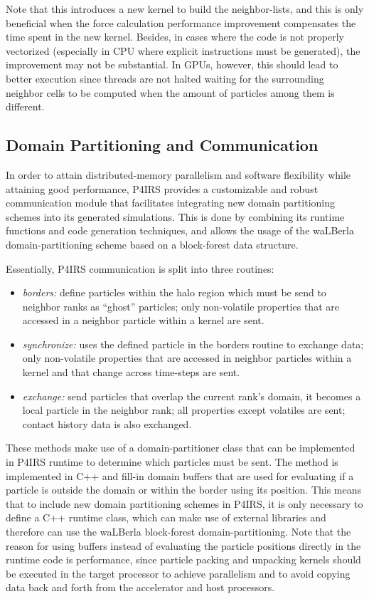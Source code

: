 \documentclass[Afour,sageh,times]{sagej}
\begin{document}
Note that this introduces a new kernel to build the neighbor-lists, and this is only beneficial when the force calculation performance improvement compensates the time spent in the new kernel.
Besides, in cases where the code is not properly vectorized (especially in CPU where explicit instructions must be generated), the improvement may not be substantial.
In GPUs, however, this should lead to better execution since threads are not halted waiting for the surrounding neighbor cells to be computed when the amount of particles among them is different.

\subsection{Domain Partitioning and Communication}
\label{sec:domain_partitioning}

In order to attain distributed-memory parallelism and software flexibility while attaining good performance, P4IRS provides a customizable and robust communication module that facilitates integrating new domain partitioning schemes into its generated simulations.
This is done by combining its runtime functions and code generation techniques, and allows the usage of the waLBerla domain-partitioning scheme based on a block-forest data structure.

Essentially, P4IRS communication is split into three routines:

\begin{itemize}
    \item \emph{borders:} define particles within the halo region which must be send to neighbor ranks as ``ghost'' particles; only non-volatile properties that are accessed in a neighbor particle within a kernel are sent.
    \item \emph{synchronize:} uses the defined particle in the borders routine to exchange data; only non-volatile properties that are accessed in neighbor particles within a kernel and that change across time-steps are sent.
    \item \emph{exchange:} send particles that overlap the current rank's domain, it becomes a local particle in the neighbor rank; all properties except volatiles are sent; contact history data is also exchanged.
\end{itemize}

These methods make use of a domain-partitioner class that can be implemented in P4IRS runtime to determine which particles must be sent.
The method is implemented in C++ and fill-in domain buffers that are used for evaluating if a particle is outside the domain or within the border using its position.
This means that to include new domain partitioning schemes in P4IRS, it is only necessary to define a C++ runtime class, which can make use of external libraries and therefore can use the waLBerla block-forest domain-partitioning.
Note that the reason for using buffers instead of evaluating the particle positions directly in the runtime code is performance, since particle packing and unpacking kernels should be executed in the target processor to achieve parallelism and to avoid copying data back and forth from the accelerator and host processors.
\end{document}
